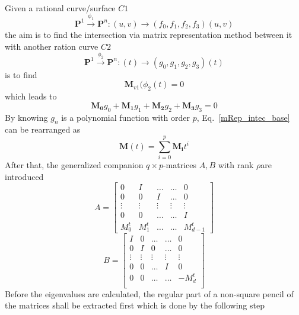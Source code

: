 \paragraph{} 
Given a rational curve/surface $C1$
\begin{equation}
	\mathbf{P}^1 \xrightarrow{\phi_1} \mathbf{P}^n: (u,v) \rightarrow(f_0,f_1,f_2,f_3)(u,v)
\end{equation}
the aim is to find the intersection via matrix representation method between it with another ration curve $C2$
\begin{equation}
	\mathbf{P}^1 \xrightarrow{\phi_2} \mathbf{P}^n: (t) \rightarrow(g_0,g_1,g_2,g_3)(t)
\end{equation}
is to find
\begin{equation}
	\mathbf{M}_{v1}(\phi_2(t) = 0
\end{equation}
which leads to
\begin{equation}
	\mathbf{M_0}g_0 + \mathbf{M_1}g_1 + \mathbf{M_2}g_2 + \mathbf{M_3}g_3 = 0
	\label{mRep_intec_base}
\end{equation}
By knowing $g_n$ is a polynomial function with order $p$, Eq.~\eqref{mRep_intec_base} can be rearranged as
\begin{equation}
	\mathbf{M}(t) = \sum_{i=0}^p \mathbf{M_i}t^i
\end{equation}
After that, the generalized companion $q\times p$-matrices $A,B$ with rank $\rho$are introduced
\begin{equation}
	A = 
	\begin{bmatrix}
		0		&I 		&\dots 		&\dots 		&0 		\\
		0 		&0 		&I 			&\dots 		&0 		\\
		\vdots 	&\vdots &\vdots 	&\vdots 	&\vdots \\
		0 		&0 		&\dots		&\dots 		&I 		\\
		M_0^t 	&M_1^t 	&\dots 		&\dots 		&M_{d-1}^t
	\end{bmatrix}
\end{equation}
\begin{equation}
	B = 
	\begin{bmatrix}
		I 		&0 		&\dots 		&\dots 		&0 		\\
		0 		&I 		&0 			&\dots 		&0 		\\
		\vdots 	&\vdots &\vdots 	&\vdots 	&\vdots \\
		0 		&0 		&\dots 		&I 			&0 		\\
		0 		&0 		&\dots 		&\dots 		&-M_d^t \\		
	\end{bmatrix}
\end{equation}
Before the eigenvalues are calculated, the regular part of a non-square pencil of the matrices shall be extracted first which is done by the following step

